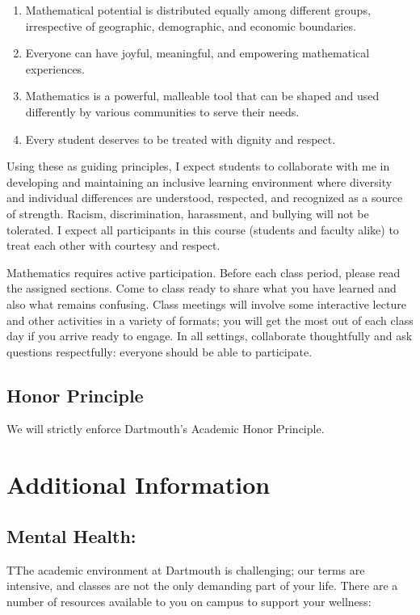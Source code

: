 \documentclass[11pt,letterpaper]{article}
\newcommand{\pageheading}[1]{\section*{#1}\addcontentsline{toc}{section}{#1}}
\begin{document}
\begin{enumerate}
\item Mathematical potential is distributed equally among different groups, irrespective of geographic, demographic, and economic boundaries.
\item Everyone can have joyful, meaningful, and empowering mathematical experiences.
\item Mathematics is a powerful, malleable tool that can be shaped and used differently by various communities to serve their needs.
\item Every student deserves to be treated with dignity and respect.
\end{enumerate}

Using these as guiding principles, I expect students to collaborate with me in developing and maintaining an inclusive learning environment where diversity and individual differences are understood, respected, and recognized as a source of strength. Racism, discrimination, harassment, and bullying will not be tolerated. I expect all participants in this course (students and faculty alike) to treat each other with courtesy and respect.

Mathematics requires active participation. Before each class period, please read the assigned sections. Come to class ready to share what you have learned and also what remains confusing. Class meetings will involve some interactive lecture and other activities in a variety of formats; you will get the most out of each class day if you arrive ready to engage. In all settings, collaborate thoughtfully and ask questions respectfully: everyone should be able to participate.

\subsection*{Honor Principle}

We will strictly enforce Dartmouth's Academic Honor Principle.

\clearpage
\pageheading{Additional Information}

\subsection*{Mental Health:}

TThe academic environment at Dartmouth is challenging; our terms are intensive, and classes are not the only demanding part of your life. There are a number of resources available to you on campus to support your wellness:
\end{document}
